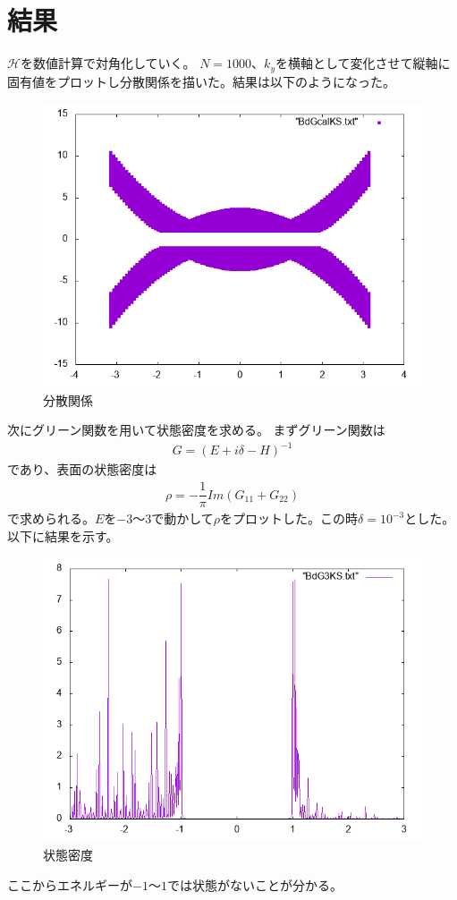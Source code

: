 \documentclass{jarticle}
\begin{document}
\section{結果}
$\mathcal{H}$を数値計算で対角化していく。
$N=1000$、$k_y$を横軸として変化させて縦軸に固有値をプロットし分散関係を描いた。結果は以下のようになった。\\
\begin{figure}[H]
	\centering
	\includegraphics[scale=0.7]{BdGcalKSs.png}
	\caption{分散関係}
\end{figure}
次にグリーン関数を用いて状態密度を求める。
まずグリーン関数は
\begin{align}
G=(E+i\delta-H)^{-1}
\end{align}
であり、表面の状態密度は
\begin{align}
\rho=-\dfrac{1}{\pi}Im(G_{11}+G_{22})
\end{align}
で求められる。$E$を$-3$〜$3$で動かして$\rho$をプロットした。この時$\delta=10^{-3}$とした。
以下に結果を示す。
\begin{figure}[H]
	\centering
	\includegraphics[scale=0.7]{BdG3KS1.png}
	\caption{状態密度}
\end{figure}
ここからエネルギーが$-1$〜$1$では状態がないことが分かる。
\end{document}
